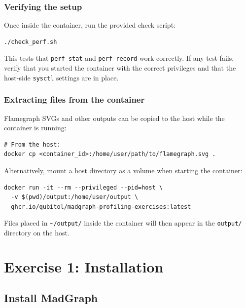 \documentclass[11pt,a4paper]{article}
\begin{document}
\subsubsection{Verifying the setup}

Once inside the container, run the provided check script:

\begin{lstlisting}
./check_perf.sh
\end{lstlisting}

This tests that \texttt{perf stat} and \texttt{perf record} work correctly.
If any test fails, verify that you started the container with the correct privileges and that the host-side \texttt{sysctl} settings are in place.

\subsubsection{Extracting files from the container}

Flamegraph SVGs and other outputs can be copied to the host while the container is running:

\begin{lstlisting}
# From the host:
docker cp <container_id>:/home/user/path/to/flamegraph.svg .
\end{lstlisting}

Alternatively, mount a host directory as a volume when starting the container:

\begin{lstlisting}
docker run -it --rm --privileged --pid=host \
  -v $(pwd)/output:/home/user/output \
  ghcr.io/qubitol/madgraph-profiling-exercises:latest
\end{lstlisting}

Files placed in \texttt{\textasciitilde/output/} inside the container will then appear in the \texttt{output/} directory on the host.

\section{Exercise 1: Installation}
\label{sec:installation}

\subsection{Install MadGraph}
\end{document}
